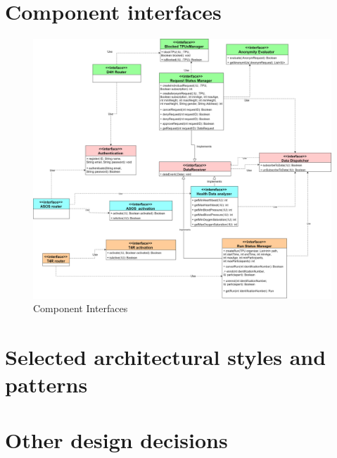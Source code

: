 \section{Component interfaces}
\begin{figure}[H]
\caption{Component Interfaces}
\centering
\includegraphics[width = \textwidth]{sections/architecturalDesign/componentInterfaces.png}
\end{figure}
\section{Selected architectural styles and patterns}
\section{Other design decisions}
